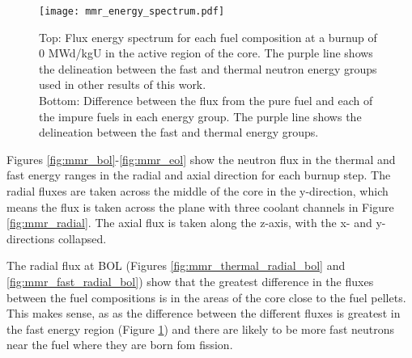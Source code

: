 \begin{figure}
        \centering
        \texttt{[image: mmr\_energy\_spectrum.pdf]}
        \caption{Top: Flux energy spectrum for each fuel composition at a 
        burnup of 0 MWd/kgU in the active region of the core. The 
        purple line shows the delineation between the fast and thermal 
        neutron energy groups used in other results of this work. \\
        Bottom: Difference between the flux from the pure fuel and each 
        of the impure fuels in each energy group. The purple line shows the 
        delineation between the fast and thermal energy groups. }
        \label{fig:mmr_energy_spectrum}
\end{figure}

Figures \ref{fig:mmr_bol}-\ref{fig:mmr_eol} show the neutron flux 
in the thermal and fast energy ranges in the radial and axial 
direction for each burnup step. The radial fluxes are taken 
across the middle of the core in the y-direction, which means the flux 
is taken across the plane with three coolant channels in Figure 
\ref{fig:mmr_radial}. The axial flux is taken along the z-axis, with the 
x- and y-directions collapsed. 

The radial flux at \gls{BOL} (Figures \ref{fig:mmr_thermal_radial_bol} and 
\ref{fig:mmr_fast_radial_bol}) show that the greatest difference in the 
fluxes between the fuel compositions is in the areas of the core close 
to the fuel pellets. This makes sense, as as the difference between the 
different fluxes is greatest in the fast energy region (Figure 
\ref{fig:mmr_energy_spectrum}) and there are likely to be more 
fast neutrons near the fuel where they are born fom fission. 


